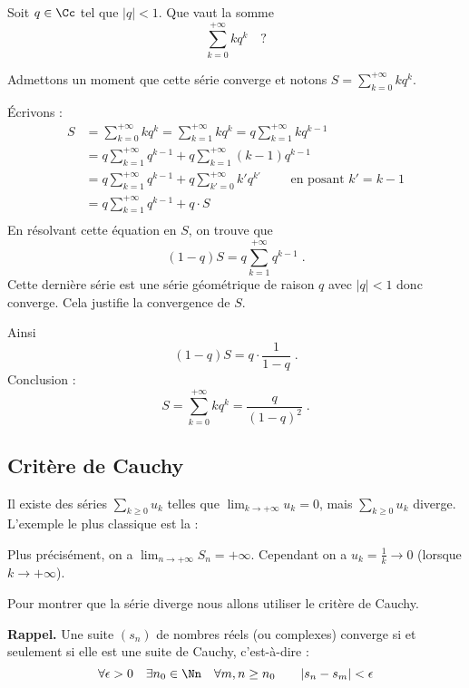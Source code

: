 \documentclass[class=report,crop=false]{standalone}
\begin{document}
\begin{exemple}
Soit $q \in \Cc$ tel que $|q|<1$.
Que vaut la somme
$$\sum_{k=0}^{+\infty} k q^k \quad \text{?}$$ 

Admettons un moment que cette série converge et notons 
$S = \sum_{k=0}^{+\infty} k q^k$.

\'Ecrivons : 
\begin{align*}
S 
&= \sum_{k=0}^{+\infty} kq^k = \sum_{k=1}^{+\infty} kq^k = q\sum_{k=1}^{+\infty} kq^{k-1} \\
&= q\sum_{k=1}^{+\infty} q^{k-1} + q\sum_{k=1}^{+\infty}(k-1)q^{k-1}\\
&= q\sum_{k=1}^{+\infty} q^{k-1} + q\sum_{k'=0}^{+\infty} k'q^{k'} \qquad \text{ en posant } k'=k-1\\
&= q\sum_{k=1}^{+\infty} q^{k-1} + q\cdot S\\
\end{align*}
En résolvant cette équation en $S$, on trouve que 
$$(1-q)S = q\sum_{k=1}^{+\infty} q^{k-1}\;.$$
Cette dernière série est une série géométrique de raison $q$ avec $|q|<1$ donc converge.
Cela justifie la convergence de $S$.

Ainsi $$(1-q)S = q \cdot \frac{1}{1-q}\;.$$
Conclusion :
$$S = \sum_{k=0}^{+\infty} k q^k = \frac{q}{(1-q)^2}\;.$$ 
\end{exemple}




\subsection{Critère de Cauchy}

Il existe des séries $\sum_{k\ge0} u_k$ telles que $\lim_{k\to+\infty} u_k=0$,
mais $\sum_{k\ge0} u_k$ diverge. L'exemple le plus classique est
la  :

Plus précisément, on a $\lim_{n\to+\infty} S_n=+\infty$. Cependant
on a $u_k = \frac{1}{k} \to 0$ (lorsque $k \to +\infty$).


\bigskip

Pour montrer que la série diverge nous allons utiliser le critère de Cauchy.



\textbf{Rappel.}
Une suite $(s_n)$ de nombres réels (ou complexes) converge 
si et seulement si elle est une suite de Cauchy, c'est-à-dire :
$$\forall \epsilon>0\quad \exists n_0\in\Nn \quad \forall m,n \ge n_0 \qquad |s_n-s_m|<\epsilon$$
\end{document}
